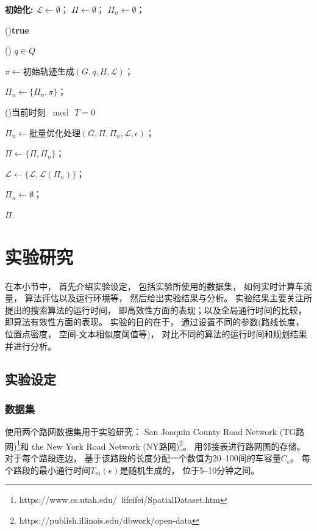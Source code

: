        \begin{algorithm}[!h]
        \caption{持续最优路线组合}
        \label{route_alg:alg3}


        \textbf{初始化:}
        $\mathcal{L} \leftarrow \emptyset$；
        $\Pi \leftarrow \emptyset$；
        $\Pi_n \leftarrow \emptyset$；

        \While(){\textbf{true}}{

            \For(){ $q \in Q$}{
                $\pi \leftarrow 初始轨迹生成(G,q,H,\mathcal{L})$；

                $\Pi_n \leftarrow \{\Pi_n,\pi\}$；
            }

            \If(){当前时刻 $\bmod\, T = 0$}{
                $\Pi_n \leftarrow 批量优化处理(G,\Pi,\Pi_n,\mathcal{L},\epsilon)$；

                $\Pi \leftarrow \{\Pi,\Pi_n\}$；

                $\mathcal{L} \leftarrow \{\mathcal{L}, \mathcal{L}(\Pi_n)\}$；

                $\Pi_n \leftarrow \emptyset$；

                \Return $\Pi$ 
            }
        }
        \end{algorithm}


\section{实验研究}
在本小节中， 首先介绍实验设定， 包括实验所使用的数据集， 如何实时计算车流量， 算法评估以及运行环境等， 然后给出实验结果与分析。 实验结果主要关注所提出的搜索算法的运行时间， 即高效性方面的表现；以及全局通行时间的比较， 即算法有效性方面的表现。 实验的目的在于， 通过设置不同的参数(路线长度， 位置点密度， 空间-文本相似度阈值等)， 对比不同的算法的运行时间和规划结果并进行分析。

\subsection{实验设定}
\subsubsection*{数据集}
使用两个路网数据集用于实验研究：
 San Joaquin County Road Network  (TG路网)\footnote{https://www.cs.utah.edu/~lifeifei/SpatialDataset.htm}和 the New York Road Network  (NY路网)\footnote{https://publish.illinois.edu/dbwork/open-data}。
 用邻接表进行路网图的存储。 对于每个路段连边， 基于该路段的长度分配一个数值为20--100间的车容量$C_e$。 每个路段的最小通行时间$T_m(e)$是随机生成的， 位于5--10分钟之间。

